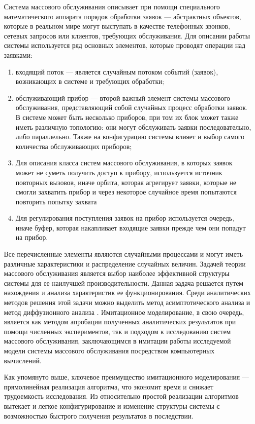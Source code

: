 Система массового обслуживания описывает при помощи специального математического аппарата \cite{nazarov2010theory} порядок обработки заявок --- абстрактных объектов, которые в реальном мире могут выступать в качестве телефонных звонков, сетевых запросов или клиентов, требующих обслуживания. Для описании работы системы используется ряд основных элементов, которые проводят операции над заявками:
\begin{enumerate}
	\item входящий поток --- является случайным потоком событий (заявок), возникающих в системе и требующих обработки;
	\item обслуживающий прибор --- второй важный элемент системы массового обслуживания, представляющий собой случайных процесс обработки заявок. В системе может быть несколько приборов, при том их блок может также иметь различную топологию: они могут обслуживать заявки последовательно, либо параллельно. Также на конфигурацию системы влияет и выбор самого количества обслуживающих приборов;
	\item Для описания класса систем массового обслуживания, в которых заявок может не суметь получить доступ к прибору, используется источник повторных вызовов, иначе орбита, которая агрегирует заявки, которые не смогли захватить прибор и через некоторое случайное время попытаются повторить попытку захвата
	\item Для регулирования поступления заявок на прибор используется очередь, иначе буфер, которая накапливает входящие заявки прежде чем они попадут на прибор.
\end{enumerate} 

Все перечисленные элементы являются случайными процессами и могут иметь различные характеристики и распределение случайных величин. Задачей теории массового обслуживания является выбор наиболее эффективной структуры системы для ее наилучшей производительности. Данная задача решается путем нахождения и анализа характеристик ее функционирования. Среди аналитических методов решения этой задачи можно выделить метод асимптотического анализа \cite{назаров1991асимптотический} и метод диффузионного анализа \cite{назаров2021исследование}. Имитационное моделирование, в свою очередь, является как методом апробации полученных аналитических результатов при помощи численных экспериментов, так и подходом к исследованию систем массового обслуживания, заключающимся в имитации работы исследуемой модели системы массового обслуживания посредством компьютерных вычислений. 

Как упомянуто выше, ключевое преимущество имитационного моделирования --- прямолинейная реализация алгоритма, что экономит время и снижает трудоемкость исследования. Из относительно простой реализации алгоритмов вытекает и легкое конфигурирование и изменение структуры системы с возможностью быстрого получения результатов в последствии.

